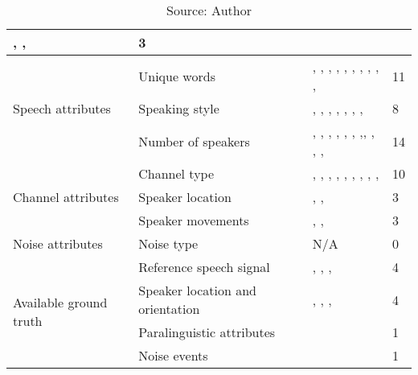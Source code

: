 \begin{landscape}
\begin{table*}[h]
\begin{tabular}{|p{4cm}|p{5cm}|p{7cm}|p{3.5cm}|}
    \cite{almeman2018building}, \cite{moore2017sheffield}, \cite{liu2016sheffield} & 3
\\ \hline \multirow{3}{*}{Speech attributes}
    & Unique words & 
    \cite{bougrine2017altruistic}, \cite{bougrine2017altruistic}, \cite{ng2017shefce}, \cite{moore2017sheffield}, \cite{ramli2017first}, \cite{goldman2016siwis}, \cite{liu2016sheffield}, \cite{ruilan2016improving}, \cite{klessa2013paralingua}, \cite{nagino2008building}, \cite{clopper2006nationwide} & 11
    \\ \cline{2-4} & Speaking style &
    \cite{dwivedi2017documenting}, \cite{bougrine2017altruistic}, \cite{ng2017shefce}, \cite{moore2017sheffield}, \cite{ramli2017first}, \cite{goldman2016siwis}, \cite{nagino2008building}, \cite{clopper2006nationwide} & 8
    \\ \cline{2-4} & Number of speakers & 
    \cite{dwivedi2017documenting}, \cite{bougrine2017altruistic}, \cite{bougrine2017altruistic}, \cite{ng2017shefce}, \cite{moore2017sheffield}, \cite{ramli2017first}, \cite{goldman2016siwis},, \cite{ruilan2016improving} \cite{liu2016sheffield}, \cite{klessa2013paralingua}, \cite{nagino2008building}, \cite{clopper2006nationwide} & 14
\\ \hline \multirow{3}{*}{Channel attributes}
    & Channel type & 
    \cite{dwivedi2017documenting}, \cite{bougrine2017altruistic}, \cite{ng2017shefce}, \cite{moore2017sheffield}, \cite{ramli2017first}, \cite{goldman2016siwis}, \cite{liu2016sheffield}, \cite{ruilan2016improving}, \cite{nagino2008building}, \cite{clopper2006nationwide} & 10
    \\ \cline{2-4} & Speaker location & 
    \cite{dwivedi2017documenting}, \cite{ng2017shefce}, \cite{liu2016sheffield} & 3
    \\ \cline{2-4} & Speaker movements & 
    \cite{dwivedi2017documenting}, \cite{moore2017sheffield}, \cite{liu2016sheffield} & 3
\\ \hline \multirow{1}{*}{Noise attributes}
    & Noise type & N/A &
    0
\\ \hline \multirow{4}{*}{Available ground truth} 
    & Reference speech signal & 
    \cite{ng2017shefce}, \cite{moore2017sheffield}, \cite{ramli2017first}, \cite{liu2016sheffield} & 4
    \\ \cline{2-4} & Speaker location and orientation &
    \cite{bougrine2017altruistic}, \cite{moore2017sheffield}, \cite{ramli2017first}, \cite{liu2016sheffield} & 4
    \\ \cline{2-4} & Paralinguistic attributes &
    \cite{klessa2013paralingua} & 1
    \\ \cline{2-4} & Noise events & 
    \cite{ramli2017first} & 1
    \\ \hline
\end{tabular}
\caption*{Source: Author}
\label{tab:results-attributes}
\end{table*}
\end{landscape}

